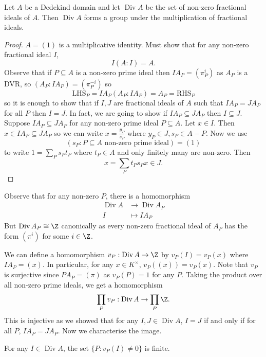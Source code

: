 \documentclass[a4paper]{article}
\DeclareMathOperator{\Div}{Div}
\begin{document}
\begin{proposition}
  Let \(A\) be a Dedekind domain and let \(\Div A\) be the set of non-zero fractional ideals of \(A\). Then \(\Div A\) forms a group under the multiplication of fractional ideals.
\end{proposition}

\begin{proof}
  \(A = (1)\) is a multiplicative identity. Must show that for any non-zero fractional ideal \(I\),
  \[
    I (A : I) = A.
  \]
  Observe that if \(P \subseteq A\) is a non-zero prime ideal then \(IA_P = (\pi_P^i)\) as \(A_P\) is a DVR, so \((A_P: IA_P) = (\pi_P^{-i})\) so
  \[
    \text{LHS}_P = IA_P (A_P: IA_P) = A_P = \text{RHS}_P
  \]
  so it is enough to show that if \(I, J\) are fractional ideals of \(A\) such that \(IA_P = JA_P\) for all \(P\) then \(I = J\). In fact, we are going to show if \(IA_P \subseteq JA_P\) then \(I \subseteq J\). Suppose \(IA_P \subseteq JA_P\) for any non-zero prime ideal \(P \subseteq A\). Let \(x \in I\). Then \(x \in IA_P \subseteq JA_P\) so we can write \(x = \frac{y_P}{s_P}\) where \(y_P \in J, s_P \in A - P\). Now we use
  \[
    (s_P: P \subseteq A \text{ non-zero prime ideal}) = (1)
  \]
  to write \(1 = \sum_P s_P t_P\) where \(t_P \in A\) and only finitely many are non-zero. Then
  \[
    x = \sum_P t_Ps_P x \in J.
  \]
\end{proof}

Observe that for any non-zero \(P\), there is a homomorphism
\begin{align*}
  \Div A &\to \Div A_P \\
  I &\mapsto IA_P
\end{align*}
But \(\Div A_P \cong \Z\) canonically as every non-zero fractional ideal of \(A_P\) has the form \((\pi^i)\) for some \(i \in \Z\).

We can define a homomorphism \(v_P: \Div A \to \Z\) by \(v_P(I) = v_P(x)\) where \(IA_P = (x)\). In particular, for any \(x \in K^\times\), \(v_P((x)) = v_P(x)\). Note that \(v_P\) is surjective since \(P A_P = (\pi)\) as \(v_P(P) = 1\) for any \(P\). Taking the product over all non-zero prime ideals, we get a homomorphism
\[
  \prod_P v_P: \Div A \to \prod_P \Z.
\]
This is injective as we showed that for any \(I, J \in \Div A\), \(I = J\) if and only if for all \(P\), \(I A_P = J A_P\). Now we characterise the image.

\begin{lemma}
  For any \(I \in \Div A\), the set \(\{P: v_P(I) \neq 0\}\) is finite. 
\end{lemma}
\end{document}
